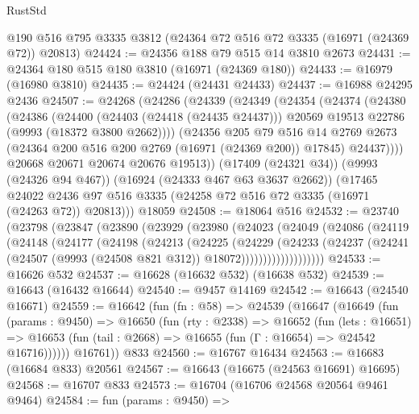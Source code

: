 \begin{lexlean}{RustStd}
\begin{coremodule}
    @190
    @516
    @795
    @3335
    @3812
    (@24364 @72 @516 @72 @3335 (@16971 (@24369 @72)) @20813)
@24424 := @24356 @188 @79 @515 @14 @3810 @2673
@24431 := @24364 @180 @515 @180 @3810 (@16971 (@24369 @180))
@24433 := @16979 (@16980 @3810)
@24435 := @24424 (@24431 @24433)
@24437 := @16988 @24295 @2436
@24507 := @24268
    (@24286
      (@24339
        (@24349
          (@24354
            (@24374
              (@24380
                (@24386
                  (@24400
                    (@24403 (@24418 (@24435 @24437)))
                    @20569
                    @19513
                    @22786
                    (@9993 (@18372 @3800 @2662))))
                (@24356
                  @205
                  @79
                  @516
                  @14
                  @2769
                  @2673
                  (@24364 @200 @516 @200 @2769 (@16971 (@24369 @200)) @17845)
                  @24437))))
          @20668
          @20671
          @20674
          @20676
          @19513))
      (@17409 (@24321 @34))
      (@9993 (@24326 @94 @467))
      (@16924 (@24333 @467 @63 @3637 @2662))
      (@17465 @24022 @2436 @97 @516 @3335 (@24258 @72 @516 @72 @3335 (@16971 (@24263 @72)) @20813)))
    @18059
@24508 := @18064 @516
@24532 := @23740
    (@23798
      (@23847
        (@23890
          (@23929
            (@23980
              (@24023
                (@24049
                  (@24086
                    (@24119
                      (@24148
                        (@24177
                          (@24198
                            (@24213
                              (@24225
                                (@24229
                                  (@24233
                                    (@24237
                                      (@24241
                                        (@24507 (@9993 (@24508 @821 @312)) @18072)))))))))))))))))))
@24533 := @16626 @532
@24537 := @16628 (@16632 @532) (@16638 @532)
@24539 := @16643 (@16432 @16644)
@24540 := @9457 @14169
@24542 := @16643 (@24540 @16671)
@24559 := @16642
    (fun (fn : @58) =>
    @24539
      (@16647
        (@16649
          (fun (params : @9450) =>
          @16650
            (fun (rty : @2338) =>
            @16652
              (fun (lets : @16651) =>
              @16653 (fun (tail : @2668) => @16655 (fun (Γ : @16654) => @24542 @16716))))))
        @16761))
    @833
@24560 := @16767 @16434
@24563 := @16683 (@16684 @833) @20561
@24567 := @16643 (@16675 (@24563 @16691) @16695)
@24568 := @16707 @833
@24573 := @16704 (@16706 @24568 @20564 @9461 @9464)
@24584 := fun (params : @9450) =>

\end{coremodule}
\end{lexlean}
